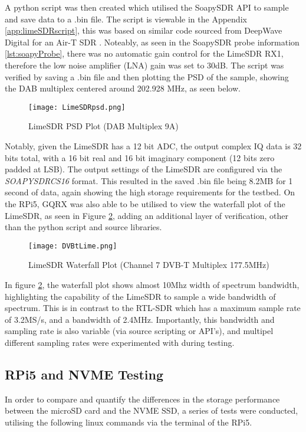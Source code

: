 \noindent A python script was then created which utilised the SoapySDR API to sample and save data to a .bin file. The script is viewable in the Appendix \ref{app:limeSDRscript}, this was based on similar code sourced from DeepWave Digital for an Air-T SDR \cite{complexSamplingPython}. Noteably, as seen in the SoapySDR probe information \ref{lst:soapyProbe}, there was no automatic gain control for the LimeSDR RX1, therefore the low noise amplifier (LNA) gain was set to 30dB. The script was verified by saving a .bin file and then plotting the PSD of the sample, showing the DAB multiplex centered around 202.928 MHz, as seen below. 

\begin{figure}[h!]
    \centering
    \texttt{[image: LimeSDRpsd.png]}
    \caption{LimeSDR PSD Plot (DAB Multiplex 9A)}
    \label{fig:limeSDRpsd}
\end{figure}

Notably, given the LimeSDR has a 12 bit ADC, the output complex IQ data is 32 bits total, with a 16 bit real and 16 bit imaginary component (12 bits zero padded at LSB). The output settings of the LimeSDR are configured via the \textit{SOAPYSDRCS16} format. This resulted in the saved .bin file being 8.2MB for 1 second of data, again showing the high storage requirements for the testbed. On the RPi5, GQRX was also able to be utilised to view the waterfall plot of the LimeSDR, as seen in Figure \ref{fig:limeSDRwaterfall}, adding an additional layer of verification, other than the python script and source libraries. 

\begin{figure}[h!]
    \centering
    \texttt{[image: DVBtLime.png]}
    \caption{LimeSDR Waterfall Plot (Channel 7 DVB-T Multiplex 177.5MHz)} 
    \label{fig:limeSDRwaterfall}
\end{figure}

In figure \ref{fig:limeSDRwaterfall}, the waterfall plot shows almost 10Mhz width of spectrum bandwidth, highlighting the capability of the LimeSDR to sample a wide bandwidth of spectrum. This is in contrast to the RTL-SDR which has a maximum sample rate of 3.2MS/s, and a bandwidth of 2.4MHz. Importantly, this bandwidth and sampling rate is also variable (via source scripting or API's), and multipel different sampling rates were experimented with during testing.

\subsection{RPi5 and NVME Testing \label{sec:sbcVerification}}
In order to compare and quantify the differences in the storage performance between the microSD card and the NVME SSD, a series of tests were conducted, utilising the following linux commands via the terminal of the RPi5.

